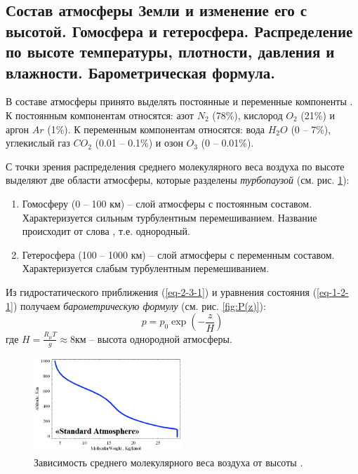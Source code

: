 \subsection{Состав атмосферы Земли и изменение его с высотой. Гомосфера и гетеросфера. Распределение по высоте температуры, плотности, давления и влажности. Барометрическая формула.}

В составе атмосферы принято выделять постоянные и переменные компоненты \cite{Nosov2019-3}.
К постоянным компонентам относятся: азот $N_{2}$ (78\%), кислород $O_{2}$ (21\%) и аргон $Ar$ (1\%).
К переменным компонентам относятся: вода $H_{2}O$ (0 -- 7\%), углекислый газ $CO_{2}$ (0.01 -- 0.1\%) и озон $O_{3}$ (0 -- 0.01\%).

С точки зрения распределения среднего молекулярного веса воздуха по высоте выделяют две области атмосферы, которые разделены \textit{турбопаузой} (см. рис. \ref{fig:mu(z)}):
\begin{enumerate}
\item Гомосферу (0 -- 100 км) -- слой атмосферы с постоянным составом. Характеризуется сильным турбулентным перемешиванием. Название происходит от слова , т.е. однородный.
\item Гетеросфера (100 -- 1000 км) -- слой атмосферы с переменным составом. Характеризуется слабым турбулентным перемешиванием.
\end{enumerate}

Из гидростатического приближения (\ref{eq-2-3-1}) и уравнения состояния (\ref{eq-1-2-1}) получаем \textit{барометрическую формулу} (см. рис. \ref{fig:P(z)}):
\begin{equation}\label{eq-1-3-1}
p=p_{0}\exp\left(-\frac{z}{H}\right)
\end{equation}где $H=\frac{R_{\mu}T}{g}\approx8\text{км}$ -- высота однородной атмосферы.

\begin{figure}[!ht]
\centering
\includegraphics[width=0.5\textwidth]{images/mu(z).png}
\caption{Зависимость среднего молекулярного веса воздуха от высоты \cite{Nosov2019-3}.}\label{fig:mu(z)}
\end{figure}

